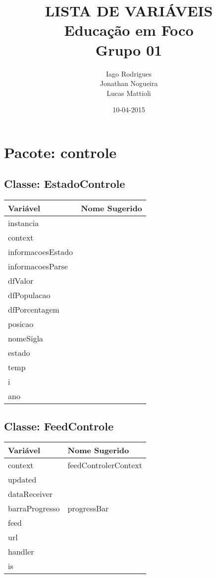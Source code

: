 \documentclass[12pt]{article}
\title{LISTA DE VARIÁVEIS\\Educação em Foco\\Grupo 01}
\date{10-04-2015}
\author{Iago Rodrigues\\Jonathan Nogueira\\Lucas Mattioli}
\begin{document}
\maketitle
{}

\newpage
{}
\tableofcontents

\newpage
\section{Pacote: controle}
	\subsection{Classe: EstadoControle}
		\begin{table}[H]
			\begin{center}
				\begin{tabular}{l | l}
					\toprule
						Variável & Nome Sugerido\\
					\midrule
						instancia & \\
						context & \\
						informacoesEstado & \\
						informacoesParse & \\
						dfValor & \\
						dfPopulacao & \\
						dfPorcentagem & \\
						posicao & \\
						nomeSigla & \\
						estado & \\
						temp & \\
						i & \\
						ano & \\
					\bottomrule
				\end{tabular}
			\end{center}
		\end{table}

	\subsection{Classe: FeedControle}
		\begin{table}[H]
			\begin{center}
				\begin{tabular}{l | l}
					\toprule
						Variável & Nome Sugerido\\
					\midrule
						context & feedControlerContext\\
						updated & \\
						dataReceiver & \\
						barraProgresso & progressBar\\
						feed & \\
						url & \\
						handler & \\
						is & \\
					\bottomrule
				\end{tabular}
			\end{center}
		\end{table}
\end{document}

